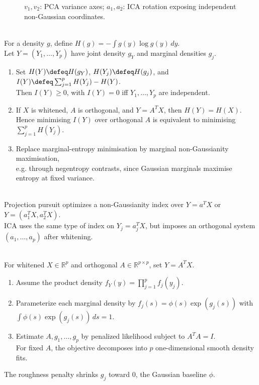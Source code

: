 \begin{figure}[H]
\centering

\caption{\textcolor{red!75!black}{$v_1,v_2$}: PCA variance axes; \textcolor{blue!70!black}{$a_1,a_2$}: ICA rotation exposing independent non-Gaussian coordinates.}
\label{fig:sl-ica-rotation-nongaussianity}
\end{figure}

\begin{method} \label{meth:sl-ica-entropy-view} \\
For a density $g$, define $H(g)=-\int g(y)\log g(y)\,dy$.\\
Let $Y=(Y_1,\ldots,Y_p)$ have joint density $g_Y$ and marginal densities $g_j$.
\begin{enumerate}[label=(\roman*)]
\setlength{\itemsep}{0pt}
\item Set $H(Y)\defeq H(g_Y)$, $H(Y_j)\defeq H(g_j)$, and $I(Y)\defeq\sum_{j=1}^pH(Y_j)-H(Y)$.\\
Then $I(Y)\ge0$, with $I(Y)=0$ iff $Y_1,\ldots,Y_p$ are independent.
\item If $X$ is whitened, $A$ is orthogonal, and $Y=A^TX$, then $H(Y)=H(X)$.\\
Hence minimising $I(Y)$ over orthogonal $A$ is equivalent to minimising $\sum_{j=1}^pH(Y_j)$.
\item Replace marginal-entropy minimisation by marginal non-Gaussianity maximisation,\\
e.g. through negentropy contrasts, since Gaussian marginals maximise entropy at fixed variance.
\end{enumerate}
\end{method}

\begin{remark} \label{rem:sl-projection-pursuit-and-ica} \\
Projection pursuit optimizes a non-Gaussianity index over $Y=a^TX$ or $Y=(a_1^TX,a_2^TX)$.\\
ICA uses the same type of index on $Y_j=a_j^TX$, but imposes an orthogonal system $(a_1,\ldots,a_p)$ after whitening.
\end{remark}

\begin{method} \label{meth:sl-product-density-ica} \\
For whitened $X\in\mathbb{R}^p$ and orthogonal $A\in\mathbb{R}^{p\times p}$, set $Y=A^TX$.
\begin{enumerate}[label=(\roman*)]
\setlength{\itemsep}{0pt}
\item Assume the product density $f_Y(y)=\prod_{j=1}^pf_j(y_j)$.
\item Parameterize each marginal density by $f_j(s)=\phi(s)\exp(g_j(s))$ with $\int\phi(s)\exp(g_j(s))\,ds=1$.
\item Estimate $A,g_1,\ldots,g_p$ by penalized likelihood subject to $A^TA=I$.\\
For fixed $A$, the objective decomposes into $p$ one-dimensional smooth density fits.
\end{enumerate}
The roughness penalty shrinks $g_j$ toward $0$, the Gaussian baseline $\phi$.
\end{method}

